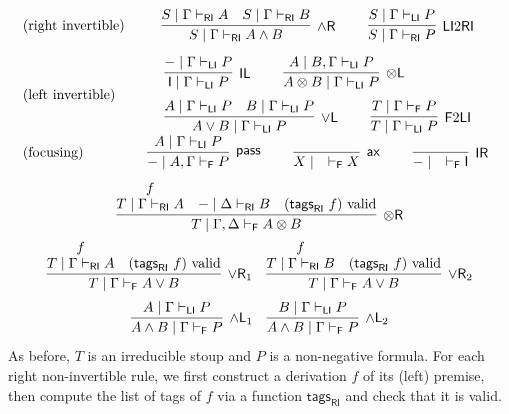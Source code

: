 \documentclass[submission,copyright,creativecommons]{eptcs}
\theoremstyle{definition}
\newcommand{\tl}{\otimes \mathsf{L}}
\newcommand{\tr}{\otimes \mathsf{R}}
\newcommand{\pass}{\mathsf{pass}}
\newcommand{\unitl}{\mathsf{IL}}
\newcommand{\unitr}{\mathsf{IR}}
\newcommand{\andlone}{\land \mathsf{L}_{1}}
\newcommand{\andltwo}{\land \mathsf{L}_{2}}
\newcommand{\andr}{\land \mathsf{R}}
\newcommand{\orl}{\lor \mathsf{L}}
\newcommand{\orrone}{\lor \mathsf{R}_{1}}
\newcommand{\orrtwo}{\lor \mathsf{R}_{2}}
\newcommand{\ax}{\mathsf{ax}}
\newcommand{\ot}{\otimes}
\newcommand{\I}{\mathsf{I}}
\newcommand{\RI}{\mathsf{RI}}
\newcommand{\LI}{\mathsf{LI}}
\newcommand{\F}{\mathsf{F}}
\newcommand{\proofbox}[1]{\begin{tabular}{l} #1 \end{tabular}}
\begin{document}
\begin{equation}\label{eq:focus:alternative}
  \begin{array}{lc}
    \text{(right invertible)} &
    \proofbox{
      \infer[\andr]{S \mid \Gamma \vdash_{\RI} A \land B}{
        S \mid \Gamma \vdash_{\RI} A
        &
        S \mid \Gamma \vdash_{\RI} B
      }
    \qquad
    \infer[\LI 2 \RI]{S \mid \Gamma \vdash_{\RI} P}{S \mid \Gamma \vdash_{\LI} P}
    }
    \\[15pt]
    \text{(left invertible)} &
    \proofbox{
      \infer[\unitl]{\I \mid \Gamma \vdash_{\LI} P}{{-} \mid \Gamma \vdash_{\LI} P}
    \qquad
    \infer[\tl]{A \ot B \mid \Gamma \vdash_{\LI} P}{A \mid B , \Gamma \vdash_{\LI} P}
    \\[6pt]
    \infer[\orl]{A \lor B \mid \Gamma \vdash_\LI P}{
      A \mid \Gamma \vdash_\LI P
      &
      B \mid \Gamma \vdash_\LI P
    }
    \qquad
    \infer[\F 2 \LI]{T \mid \Gamma \vdash_{\LI} P}{T \mid \Gamma \vdash_{\F} P}
    }
    \\[15pt]
    \text{(focusing)} &
    \proofbox{
    \infer[\pass]{{-} \mid A , \Gamma \vdash_{\F} P }{
        A \mid \Gamma \vdash_{\LI} P
    }
    \qquad
    \infer[\ax]{X \mid \quad \vdash_{\F} X}{}
    \qquad
    \infer[\unitr]{{-} \mid \quad \vdash_{\F} \I}{}
    }
    \\[15pt]
    \multicolumn{2}{c}{
    \infer[\tr]{T \mid \Gamma , \Delta \vdash_{\F} A \ot B}{
      \deduce{T \mid \Gamma \vdash_{\RI} A}{f}
      &
      {-} \mid \Delta \vdash_{\RI} B
      &
      (\mathsf{tags}_{\RI}\ f) \ \text{valid}
    }
    }
    \\[6pt]
    \multicolumn{2}{c}{
    \infer[\orrone]{T \mid \Gamma \vdash_{\F} A \lor B}{
      \deduce{T \mid \Gamma \vdash_{\RI} A}{f}
      &
      (\mathsf{tags}_{\RI} \ f) \ \text{valid}
    }
    \quad
    \infer[\orrtwo]{T \mid \Gamma \vdash_{\F} A \lor B}{
      \deduce{T \mid \Gamma \vdash_{\RI} B}{f}
      &
      (\mathsf{tags}_{\RI} \ f) \ \text{valid}
    }
    }
    \\[6pt]
    \multicolumn{2}{c}{
    \infer[\andlone]{A \land B \mid \Gamma \vdash_{\F} P}{A \mid \Gamma \vdash_{\LI} P}
    \quad
    \infer[\andltwo]{A \land B \mid \Gamma \vdash_{\F} P}{B \mid \Gamma \vdash_{\LI} P}
    }
  \end{array}%
\end{equation}
As before, $T$ is an irreducible stoup and $P$ is a non-negative formula. For each right non-invertible rule, we first construct a derivation $f$ of its (left) premise, then compute the list of tags of $f$ via a function $\mathsf{tags}_{\RI}$ and check that it is valid.
\end{document}
